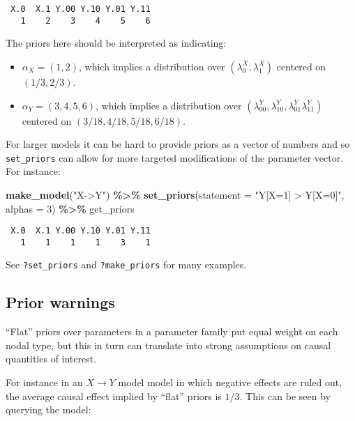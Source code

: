 \documentclass[
  12pt,
]{book}
\newenvironment{Shaded}{\begin{snugshade}}{\end{snugshade}}
\newcommand{\AttributeTok}[1]{\textcolor[rgb]{0.13,0.29,0.53}{#1}}
\newcommand{\DecValTok}[1]{\textcolor[rgb]{0.00,0.00,0.81}{#1}}
\newcommand{\FunctionTok}[1]{\textcolor[rgb]{0.13,0.29,0.53}{\textbf{#1}}}
\newcommand{\NormalTok}[1]{#1}
\newcommand{\SpecialCharTok}[1]{\textcolor[rgb]{0.81,0.36,0.00}{\textbf{#1}}}
\newcommand{\StringTok}[1]{\textcolor[rgb]{0.31,0.60,0.02}{#1}}
\providecommand{\tightlist}{%
  \setlength{\itemsep}{0pt}\setlength{\parskip}{0pt}}
\begin{document}
\begin{verbatim}
 X.0  X.1 Y.00 Y.10 Y.01 Y.11 
   1    2    3    4    5    6 
\end{verbatim}

The priors here should be interpreted as indicating:

\begin{itemize}
\tightlist
\item
  \(\alpha_X = (1,2)\), which implies a distribution over \((\lambda^X_0, \lambda^X_1)\) centered on \((1/3, 2/3)\).
\item
  \(\alpha_Y = (3,4,5,6)\), which implies a distribution over \((\lambda^Y_{00}, \lambda^Y_{10}, \lambda^Y_{01} \lambda^Y_{11})\) centered on \((3/18, 4/18, 5/18, 6/18)\).
\end{itemize}

For larger models it can be hard to provide priors as a vector of numbers and so \texttt{set\_priors} can allow for more targeted modifications of the parameter vector. For instance:

\begin{Shaded}
\begin{Highlighting}[]
\FunctionTok{make\_model}\NormalTok{(}\StringTok{"X{-}\textgreater{}Y"}\NormalTok{) }\SpecialCharTok{\%\textgreater{}\%}
  \FunctionTok{set\_priors}\NormalTok{(}\AttributeTok{statement =} \StringTok{"Y[X=1] \textgreater{} Y[X=0]"}\NormalTok{, }\AttributeTok{alphas =} \DecValTok{3}\NormalTok{) }\SpecialCharTok{\%\textgreater{}\%}
\NormalTok{  get\_priors}
\end{Highlighting}
\end{Shaded}

\begin{verbatim}
 X.0  X.1 Y.00 Y.10 Y.01 Y.11 
   1    1    1    1    3    1 
\end{verbatim}

See \texttt{?set\_priors} and \texttt{?make\_priors} for many examples.

\hypertarget{prior-warnings}{%
\subsection{Prior warnings}\label{prior-warnings}}

``Flat'' priors over parameters in a parameter family put equal weight on each nodal type, but this in turn can translate into strong assumptions on causal quantities of interest.

For instance in an \(X \rightarrow Y\) model model in which negative effects are ruled out, the average causal effect implied by ``flat'' priors is \(1/3\). This can be seen by querying the model:
\end{document}
